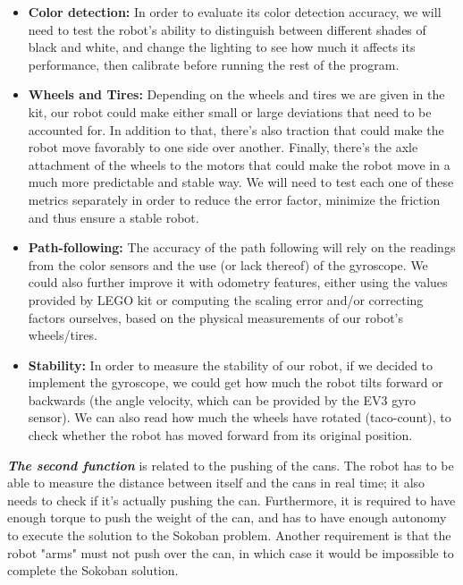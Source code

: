 \documentclass[a4paper,12pt]{article}
\begin{document}
\begin{itemize}
\item
\textbf{Color detection:} In order to evaluate its color detection accuracy, we will need to test the robot's ability to distinguish between different shades of black and white, and change the lighting to see how much it affects its performance, then calibrate before running the rest of the program.\newline

\item
\textbf{Wheels and Tires:} Depending on the wheels and tires we are given in the kit, our robot could make either small or large deviations that need to be accounted for. In addition to that, there's also traction that could make the robot move favorably to one side over another. Finally, there's the axle attachment of the wheels to the motors that could make the robot move in a much more predictable and stable way. We will need to test each one of these metrics separately in order to reduce the error factor, minimize the friction and thus ensure a stable robot.\newline

\item
\textbf{Path-following:} The accuracy of the path following will rely on the readings from the color sensors and the use (or lack thereof) of the gyroscope. We could also further improve it with odometry features, either using the values provided by LEGO kit or computing the scaling error and/or correcting factors ourselves, based on the physical measurements of our robot's wheels/tires.\newline

\item
\textbf{Stability:} In order to measure the stability of our robot, if we decided to implement the gyroscope, we could get how much the robot tilts forward or backwards (the angle velocity, which can be provided by the EV3 gyro sensor). We can also read how much the wheels have rotated (taco-count), to check whether the robot has moved forward from its original position.\newline
\end{itemize}


\textbf{\emph{The second function}} is related to the pushing of the cans. The robot has to be able to measure the distance between itself and the cans in real time; it also needs to check if it's actually pushing the can. Furthermore, it is required to have enough torque to push the weight of the can, and has to have enough autonomy to execute the solution to the Sokoban problem. Another requirement is that the robot "arms" must not push over the can, in which case it would be impossible to complete the Sokoban solution.
\end{document}
